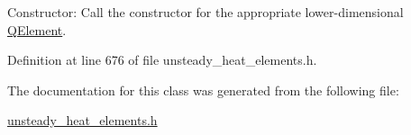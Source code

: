 Constructor\+: Call the constructor for the appropriate lower-\/dimensional \hyperlink{classoomph_1_1QElement}{Q\+Element}. 



Definition at line 676 of file unsteady\+\_\+heat\+\_\+elements.\+h.



The documentation for this class was generated from the following file\+:\begin{DoxyCompactItemize}
\item 
\hyperlink{unsteady__heat__elements_8h}{unsteady\+\_\+heat\+\_\+elements.\+h}\end{DoxyCompactItemize}
